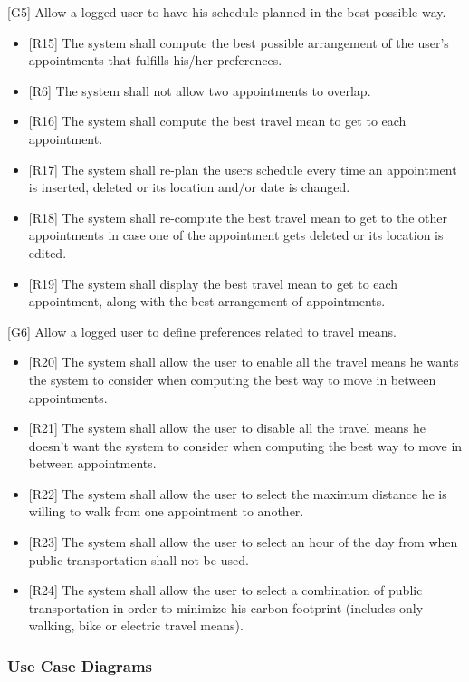 \documentclass[12pt]{article}
\begin{document}
{[G5]} Allow a logged user to have his schedule planned in the best possible way.
\begin{itemize}
    \item{[R15]} The system shall compute the best possible arrangement of the user's appointments that fulfills his/her preferences.
    \item{[R6]} The system shall not allow two appointments to overlap.
    \item{[R16]} The system shall compute the best travel mean to get to each appointment.
    \item{[R17]} The system shall re-plan the users schedule every time an appointment is inserted, deleted or its location and/or date is changed.
    \item{[R18]} The system shall re-compute the best travel mean to get to the other appointments in case one of the appointment gets deleted or its location is edited.
    \item{[R19]} The system shall display the best travel mean to get to each appointment, along with the best arrangement of appointments.
    
\end{itemize}
{[G6]} Allow a logged user to define preferences related to travel means.
\begin{itemize}
    \item{[R20]} The system shall allow the user to enable all the travel means he wants the system to consider when computing the best way to move in between appointments.
    \item{[R21]} The system shall allow the user to disable all the travel means he doesn't want the system to consider when computing the best way to move in between appointments.
    \item{[R22]} The system shall allow the user to select the maximum distance he is willing to walk from one appointment to another.
    \item{[R23]} The system shall allow the user to select an hour of the day from when public transportation shall not be used.
    \item{[R24]} The system shall allow the user to select a combination of public transportation in order to minimize his carbon footprint (includes only walking, bike or electric travel means).
\end{itemize}

\newpage
\subsubsection{Use Case Diagrams}
\end{document}
